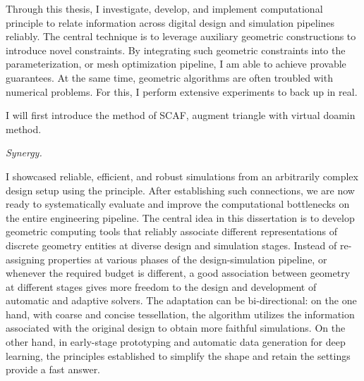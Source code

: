 
Through this thesis, I investigate, develop, and implement computational principle to relate information across digital design and simulation pipelines reliably. 
The central technique is to leverage auxiliary geometric constructions to introduce novel constraints. 
By integrating such geometric constraints into the parameterization, or mesh optimization pipeline,  I am able to achieve provable guarantees. 
At the same time, geometric algorithms are often troubled with numerical problems. For this, I perform extensive experiments to back up in real.

I will first introduce the method of SCAF, 
augment triangle with virtual doamin method.

\emph{Synergy.}

I showcased reliable, efficient, and robust simulations from an arbitrarily complex design setup using the principle. After establishing such connections, we are now ready to systematically evaluate and improve the computational bottlenecks on the entire engineering pipeline.
The central idea in this dissertation is to develop geometric computing tools that reliably associate different representations of discrete geometry entities at diverse design and simulation stages. Instead of re-assigning properties at various phases of the design-simulation pipeline, or whenever the required budget is different, a good association between geometry at different stages gives more freedom to the design and development of automatic and adaptive solvers. The adaptation can be bi-directional: on the one hand, with coarse and concise tessellation, the algorithm utilizes the information associated with the original design to obtain more faithful simulations. On the other hand, in early-stage prototyping and automatic data generation for deep learning, the principles established to simplify the shape and retain the settings provide a fast answer. 

